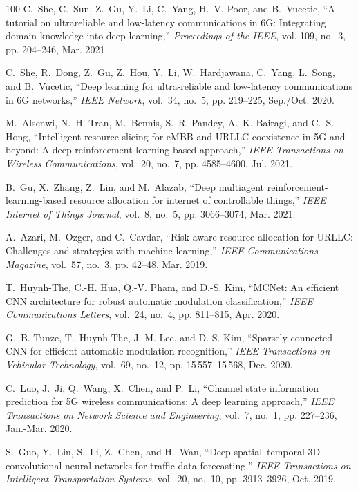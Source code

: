 \documentclass[journal]{IEEEtran}
\begin{document}
\begin{thebibliography}{100}
	C.~She, C.~Sun, Z.~Gu, Y.~Li, C.~Yang, H.~V. Poor, and B.~Vucetic, ``A tutorial
	on ultrareliable and low-latency communications in {6G}: Integrating domain
	knowledge into deep learning,'' \emph{Proceedings of the IEEE}, vol. 109,
	no.~3, pp. 204--246, Mar. 2021.
	
	C.~She, R.~Dong, Z.~Gu, Z.~Hou, Y.~Li, W.~Hardjawana, C.~Yang, L.~Song, and
	B.~Vucetic, ``Deep learning for ultra-reliable and low-latency communications
	in {6G} networks,'' \emph{IEEE Network}, vol.~34, no.~5, pp. 219--225,
	Sep./Oct. 2020.
	
	M.~Alsenwi, N.~H. Tran, M.~Bennis, S.~R. Pandey, A.~K. Bairagi, and C.~S. Hong,
	``Intelligent resource slicing for {eMBB} and {URLLC} coexistence in {5G} and
	beyond: A deep reinforcement learning based approach,'' \emph{IEEE
		Transactions on Wireless Communications}, vol.~20, no.~7, pp. 4585--4600,
	Jul. 2021.
	
	B.~Gu, X.~Zhang, Z.~Lin, and M.~Alazab, ``Deep multiagent
	reinforcement-learning-based resource allocation for internet of controllable
	things,'' \emph{IEEE Internet of Things Journal}, vol.~8, no.~5, pp.
	3066--3074, Mar. 2021.
	
	A.~Azari, M.~Ozger, and C.~Cavdar, ``Risk-aware resource allocation for
	{URLLC}: Challenges and strategies with machine learning,'' \emph{IEEE
		Communications Magazine}, vol.~57, no.~3, pp. 42--48, Mar. 2019.
	
	T.~Huynh-The, C.-H. Hua, Q.-V. Pham, and D.-S. Kim, ``{MCNet}: An efficient
	{CNN} architecture for robust automatic modulation classification,''
	\emph{IEEE Communications Letters}, vol.~24, no.~4, pp. 811--815, Apr. 2020.
	
	G.~B. Tunze, T.~Huynh-The, J.-M. Lee, and D.-S. Kim, ``Sparsely connected {CNN}
	for efficient automatic modulation recognition,'' \emph{IEEE Transactions on
		Vehicular Technology}, vol.~69, no.~12, pp. 15\,557--15\,568, Dec. 2020.
	
	C.~Luo, J.~Ji, Q.~Wang, X.~Chen, and P.~Li, ``Channel state information
	prediction for {5G} wireless communications: A deep learning approach,''
	\emph{IEEE Transactions on Network Science and Engineering}, vol.~7, no.~1,
	pp. 227--236, Jan.-Mar. 2020.
	
	S.~Guo, Y.~Lin, S.~Li, Z.~Chen, and H.~Wan, ``Deep spatial–temporal {3D}
	convolutional neural networks for traffic data forecasting,'' \emph{IEEE
		Transactions on Intelligent Transportation Systems}, vol.~20, no.~10, pp.
	3913--3926, Oct. 2019.
	

\end{thebibliography}
\end{document}
